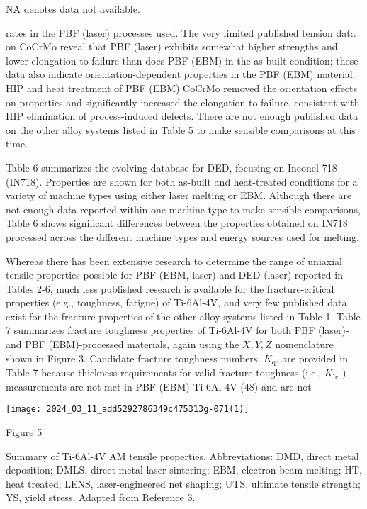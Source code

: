 \documentclass[10pt]{article}
\begin{document}
NA denotes data not available.

rates in the PBF (laser) processes used. The very limited published tension data on CoCrMo reveal that PBF (laser) exhibits somewhat higher strengths and lower elongation to failure than does PBF (EBM) in the as-built condition; these data also indicate orientation-dependent properties in the PBF (EBM) material. HIP and heat treatment of PBF (EBM) CoCrMo removed the orientation effects on properties and significantly increased the elongation to failure, consistent with HIP elimination of process-induced defects. There are not enough published data on the other alloy systems listed in Table 5 to make sensible comparisons at this time.

Table 6 summarizes the evolving database for DED, focusing on Inconel 718 (IN718). Properties are shown for both as-built and heat-treated conditions for a variety of machine types using either laser melting or EBM. Although there are not enough data reported within one machine type to make sensible comparisons, Table 6 shows significant differences between the properties obtained on IN718 processed across the different machine types and energy sources used for melting.

Whereas there has been extensive research to determine the range of uniaxial tensile properties possible for PBF (EBM, laser) and DED (laser) reported in Tables 2-6, much less published research is available for the fracture-critical properties (e.g., toughness, fatigue) of Ti-6Al-4V, and very few published data exist for the fracture properties of the other alloy systems listed in Table 1. Table 7 summarizes fracture toughness properties of Ti-6Al-4V for both PBF (laser)- and PBF (EBM)-processed materials, again using the $X, Y, Z$ nomenclature shown in Figure 3. Candidate fracture toughness numbers, $K_{\mathrm{q}}$, are provided in Table 7 because thickness requirements for valid fracture toughness (i.e., $K_{\mathrm{Ic}}$ ) measurements are not met in PBF (EBM) Ti-6Al-4V (48) and are not

\begin{center}
\texttt{[image: 2024\_03\_11\_add5292786349c475313g-071(1)]}
\end{center}

Figure 5

Summary of Ti-6Al-4V AM tensile properties. Abbreviations: DMD, direct metal deposition; DMLS, direct metal laser sintering; EBM, electron beam melting; HT, heat treated; LENS, laser-engineered net shaping; UTS, ultimate tensile strength; YS, yield stress. Adapted from Reference 3.
\end{document}
